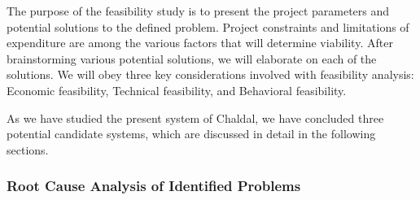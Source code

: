 \documentclass[12pt,a4paper]{article}
\begin{document}
The purpose of the feasibility study is to present the project parameters and potential solutions to the defined problem. Project constraints and limitations of expenditure are among the various factors that will determine viability. After brainstorming various potential solutions, we will elaborate on each of the solutions. We will obey three key considerations involved with feasibility analysis: Economic feasibility, Technical feasibility, and Behavioral feasibility.

As we have studied the present system of Chaldal, we have concluded three potential candidate systems, which are discussed in detail in the following sections.

\subsubsection{Root Cause Analysis of Identified Problems}
\end{document}
